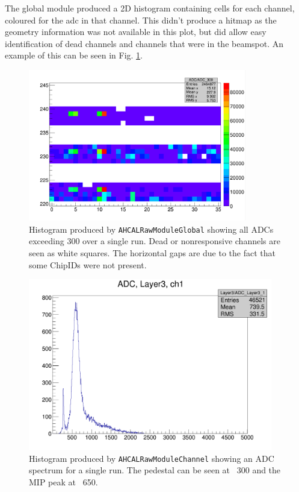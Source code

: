 The global module produced a 2D histogram containing cells for each channel, coloured for the \acrshort{adc} in that channel. This didn't produce a hitmap as the geometry information was not available in this plot, but did allow easy identification of dead channels and channels that were in the beamspot. An example of this can be seen in Fig. \ref{figure:aida/may2016/globalmodule}.

\begin{figure}[p]
	\centering
	\includegraphics[width=0.85\textwidth]{../Pictures/GlobalModule-May2016.png} %
	\caption{Histogram produced by \texttt{AHCALRawModuleGlobal} showing all ADCs exceeding 300 over a single run. Dead or nonresponsive channels are seen as white squares. The horizontal gaps are due to the fact that some ChipIDs were not present.}
	\label{figure:aida/may2016/globalmodule}
\end{figure}

\begin{figure}[p]
	\centering
	\includegraphics[width=0.95\textwidth]{../Pictures/ChannelModule-May2016.png} %
	\caption{Histogram produced by \texttt{AHCALRawModuleChannel} showing an ADC spectrum for a single run. The pedestal can be seen at ~300 and the MIP peak at ~650.}
	\label{figure:aida/may2016/channelmodule}
\end{figure}

